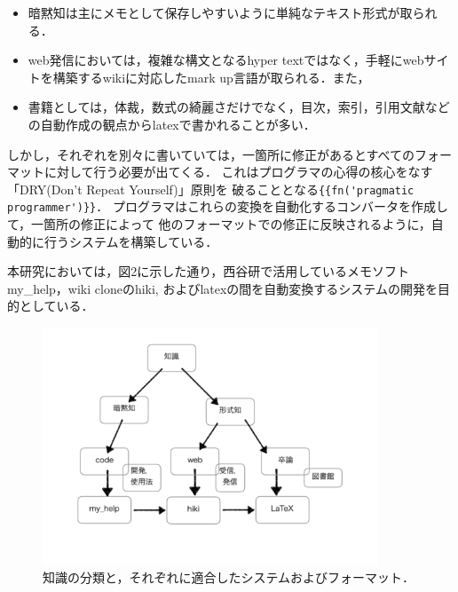 \begin{itemize}
\item 暗黙知は主にメモとして保存しやすいように単純なテキスト形式が取られる．
\item web発信においては，複雑な構文となるhyper textではなく，手軽にwebサイトを構築するwikiに対応したmark up言語が取られる．また，
\item 書籍としては，体裁，数式の綺麗さだけでなく，目次，索引，引用文献などの自動作成の観点からlatexで書かれることが多い．
\end{itemize}
しかし，それぞれを別々に書いていては，一箇所に修正があるとすべてのフォーマットに対して行う必要が出てくる．
これはプログラマの心得の核心をなす「DRY(Don't Repeat Yourself)」原則を
破ることとなる\verb|{{fn('pragmatic programmer')}}|．
プログラマはこれらの変換を自動化するコンバータを作成して，一箇所の修正によって
他のフォーマットでの修正に反映されるように，自動的に行うシステムを構築している．

本研究においては，図2に示した通り，西谷研で活用しているメモソフト
my\_help，wiki cloneのhiki, およびlatexの間を自動変換するシステムの開発を目的としている．

\begin{figure}[htbp]\begin{center}
\includegraphics[width=10cm,bb= 0 0 737 453]{../figs/./knowledge_controll_cui.png}
\caption{知識の分類と，それぞれに適合したシステムおよびフォーマット．}
\label{default}\end{center}\end{figure}
